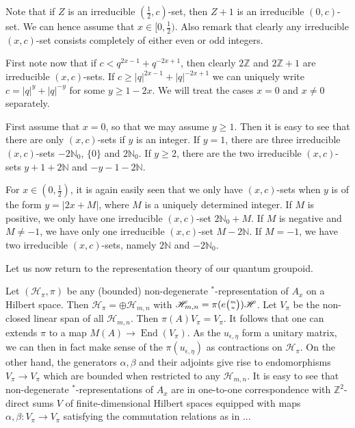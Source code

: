 \documentclass[12pt]{article}
\theoremstyle{change}
\DeclareMathOperator{\End}{\mathrm{End}}
\newcommand{\Z}{\mathbb{Z}}
\newcommand{\N}{\mathbb{N}}
\newcommand{\Hsp}{\mathscr{H}}
\newcommand{\un}[2]{e{{\tiny \begin{pmatrix}#1\\ #2\end{pmatrix}}}}
\theoremstyle{definition}
\numberwithin{equation}{section}
\begin{document}
Note that if $Z$ is an irreducible $(\frac{1}{2},c)$-set, then $Z+1$ is an irreducible $(0,c)$-set. We can hence assume that $x\in \lbrack 0,\frac{1}{2})$. Also remark that clearly any irreducible $(x,c)$-set consists completely of either even or odd integers. 

First note now that if $c< q^{2x-1}+q^{-2x+1}$, then clearly $2\Z$ and $2\Z+1$ are irreducible $(x,c)$-sets. If $c\geq |q|^{2x-1}+|q|^{-2x+1}$ we can uniquely write $c=|q|^y+|q|^{-y}$ for some $y\geq 1-2x$. We will treat the cases $x=0$ and $x\neq 0$ separately.

First assume that $x=0$, so that we may assume $y\geq 1$. Then it is easy to see that there are only $(x,c)$-sets if $y$ is an integer. If $y=1$,  there are three irreducible $(x,c)$-sets $-2\N_0$, $\{0\}$ and $2\N_0$. If $y\geq 2$,  there are the two irreducible $(x,c)$-sets $y+1+2\N$ and $-y-1-2\N$.

For $x\in (0,\frac{1}{2})$, it is again easily seen that we only have $(x,c)$-sets when $y$ is of the form $y=|2x+M|$, where $M$ is a uniquely determined integer. If $M$ is positive, we only have one irreducible $(x,c)$-set $2\N_0+M$. If $M$ is negative and $M\neq -1$, we have only one irreducible $(x,c)$-set  $M-2\N$. If $M=-1$, we have two irreducible $(x,c)$-sets, namely $2\N$ and $-2\N_0$.

Let us now return to the representation theory of our quantum groupoid.

Let $(\Hsp_{\pi},\pi)$ be any (bounded) non-degenerate $^*$-representation of $A_x$ on a Hilbert space. Then $\Hsp_{\pi} = \oplus \Hsp_{m,n}$ with $\Hsp_{m,n} = \pi(\un{m}{n})\Hsp$. Let $V_{\pi}$ be the non-closed linear span of all $\Hsp_{m,n}$. Then $\pi(A)V_{\pi} = V_{\pi}$. It follows that one can extends $\pi$ to a map $M(A) \rightarrow \End(V_{\pi})$. As the $u_{\epsilon,\eta}$ form a unitary matrix, we can then in fact make sense of the $\pi(u_{\epsilon,\eta})$ as contractions on $\Hsp_{\pi}$. On the other hand, the generators $\alpha,\beta$ and their adjoints give rise to endomorphisms $V_{\pi}\rightarrow V_{\pi}$ which are bounded when restricted to any $\Hsp_{m,n}$. It is easy to see that non-degenerate $^*$-representations of $A_x$ are in one-to-one correspondence with $\Z^2$-direct sums $V$ of finite-dimensional Hilbert spaces equipped with maps $\alpha,\beta:V_{\pi}\rightarrow V_{\pi}$ satisfying the commutation relations as in ...
\end{document}
